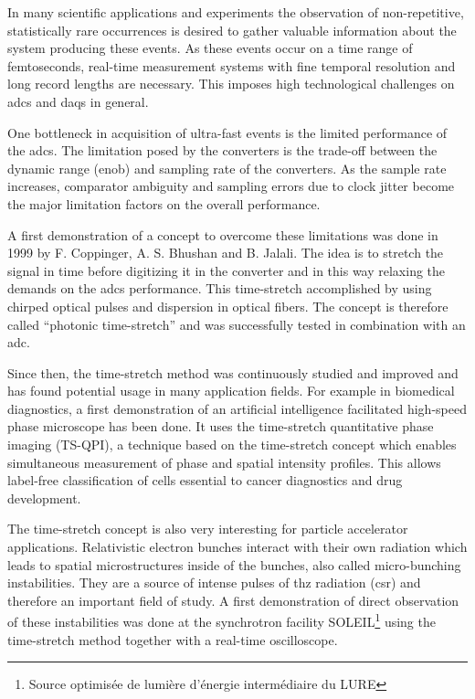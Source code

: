 In many scientific applications and experiments the observation of non-repetitive, statistically rare occurrences is desired to gather valuable information about the system producing these events.
As these events occur on a time range of femtoseconds, real-time measurement systems with fine temporal resolution and long record lengths are necessary.
This imposes high technological challenges on \glspl{adc} and \glspl{daq} in general.

One bottleneck in acquisition of ultra-fast events is the limited performance of the \glspl{adc}. 
The limitation posed by the converters is the trade-off between the dynamic range (\gls{enob}) and sampling rate of the converters.
As the sample rate increases, comparator ambiguity and sampling errors due to clock jitter become the major limitation factors on the overall performance. \cite{Mahjoubfar2017}

A first demonstration of a concept to overcome these limitations was done in 1999 by F. Coppinger, A. S. Bhushan and B. Jalali. The idea is to stretch the signal in time before digitizing it in the converter and in this way relaxing the demands on the \glspl{adc} performance. 
This time-stretch accomplished by using chirped optical pulses and dispersion in optical fibers. The concept is therefore called ``photonic time-stretch'' and was successfully tested in combination with an \gls{adc}. \cite{ts_adc}

Since then, the time-stretch method was continuously studied and improved and has found potential usage in many application fields.
For example in biomedical diagnostics, a first demonstration of an artificial intelligence facilitated high-speed phase microscope has been done. It uses the time-stretch quantitative phase imaging (TS-QPI), a technique based on the time-stretch concept which enables simultaneous measurement of phase and spatial intensity profiles. This allows label-free classification of cells essential to cancer diagnostics and drug development. 

The time-stretch concept is also very interesting for particle accelerator applications.
Relativistic electron bunches interact with their own radiation which leads to spatial microstructures inside of the bunches, also called micro-bunching instabilities. They are a source of intense pulses of \gls{thz} radiation (\gls{csr}) and therefore an important field of study. A first demonstration of direct observation of these instabilities was done at the synchrotron facility SOLEIL\footnote{Source optimisée de lumière d’énergie intermédiaire du LURE} using the time-stretch method together with a real-time oscilloscope. \cite{Roussel2015} 


